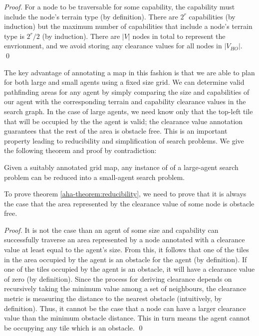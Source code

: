 \begin{proof}
For a node to be traversable for some capability, the capability must include the node's terrain type (by definition). 
There are $2^r$ capabilities (by induction) but the maximum number of capabilities that include a node's terrain type is $2^r/2$ (by induction). There are $|V|$ nodes in total to represent the envrionment, and we avoid storing any clearance values for all nodes in $|V_{HO}|$. 
\qed
\end{proof}

The key advantage of annotating a map in this fashion is that we are able to plan for both large and small agents using a fixed size grid. 
We can determine valid pathfinding areas for any agent by simply comparing the size and capabilities of our agent with the corresponding terrain and capability clearance values in the search graph. 
In the case of large agents, we need know only that the top-left tile that will be occupied by the the agent is valid; the clearance value annotation guarantees that the rest of the area is obstacle free. This is an important property leading to reducibility and simplification of search problems. We give the following theorem and proof by contradiction:

\begin{theorem}
\label{aha-theorem:reducibility}
Given a suitably annotated grid map, any instance of of a large-agent search problem can be reduced into a small-agent search problem.
\end{theorem}

To prove theorem \ref{aha-theorem:reducibility}, we need to prove that it is always the case that the area represented by the clearance value of some node is obstacle free. 
\begin{proof}
It is not the case than an agent of some size and capability can successfully traverse an area represented by a node annotated with a clearance value at least equal to the agent's size. From this, it follows that one of the tiles in the area occupied by the agent is an obstacle for the agent (by definition). If one of the tiles occupied by the agent is an obstacle, it will have a clearance value of zero (by definition). Since the process for deriving clearance depends on recursively taking the minimum value among a set of neighbours, the clearance metric is measuring the distance to the nearest obstacle (intuitively, by definition). Thus, it cannot be the case that a node can have a larger clearance value than the minimum obstacle distance. This in turn means the agent cannot be occupying any tile which is an obstacle. \qed
\end{proof}
